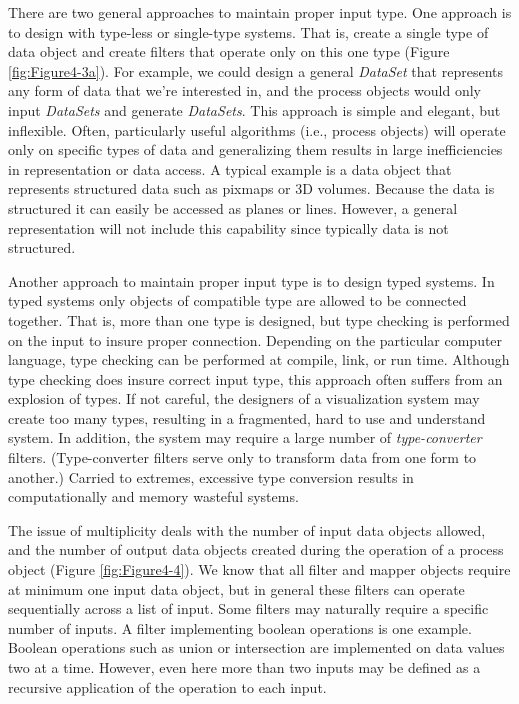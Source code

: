 There are two general approaches to maintain proper input type. One approach is to design with type-less or single-type systems. That is, create a single type of data object and create filters that operate only on this one type (Figure \ref{fig:Figure4-3a}). For example, we could design a general \emph{DataSet} that represents any form of data that we're interested in, and the process objects would only input \emph{DataSets} and generate \emph{DataSets}. This approach is simple and elegant, but inflexible. Often, particularly useful algorithms (i.e., process objects) will operate only on specific types of data and generalizing them results in large inefficiencies in representation or data access. A typical example is a data object that represents structured data such as pixmaps or 3D volumes. Because the data is structured it can easily be accessed as planes or lines. However, a general representation will not include this capability since typically data is not structured.

Another approach to maintain proper input type is to design typed systems. In typed systems only objects of compatible type are allowed to be connected together. That is, more than one type is designed, but type checking is performed on the input to insure proper connection. Depending on the particular computer language, type checking can be performed at compile, link, or run time. Although type checking does insure correct input type, this approach often suffers from an explosion of types. If not careful, the designers of a visualization system may create too many types, resulting in a fragmented, hard to use and understand system. In addition, the system may require a large number of \emph{type-converter} filters. (Type-converter filters serve only to transform data from one form to another.) Carried to extremes, excessive type conversion results in computationally and memory wasteful systems.

The issue of multiplicity deals with the number of input data objects allowed, and the number of output data objects created during the operation of a process object (Figure \ref{fig:Figure4-4}). We know that all filter and mapper objects require at minimum one input data object, but in general these filters can operate sequentially across a list of input. Some filters may naturally require a specific number of inputs. A filter implementing boolean operations is one example. Boolean operations such as union or intersection are implemented on data values two at a time. However, even here more than two inputs may be defined as a recursive application of the operation to each input.

